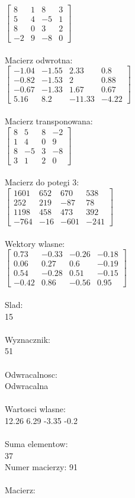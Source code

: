 \documentclass[a4paper,12pt]{article}
\begin{document}
$\begin{bmatrix} 8&1&8&3\\5&4&-5&1\\8&0&3&2\\-2&9&-8&0 \end{bmatrix}$
\\
\\
Macierz odwrotna:\\

$\begin{bmatrix} -1.04&-1.55&2.33&0.8\\-0.82&-1.53&2&0.88\\-0.67&-1.33&1.67&0.67\\5.16&8.2&-11.33&-4.22 \end{bmatrix}$
\\
\\
Macierz transponowana:\\

$\begin{bmatrix} 8&5&8&-2\\1&4&0&9\\8&-5&3&-8\\3&1&2&0 \end{bmatrix}$
\\
\\
Macierz do potegi 3:\\

$\begin{bmatrix} 1601&652&670&538\\252&219&-87&78\\1198&458&473&392\\-764&-16&-601&-241 \end{bmatrix}$
\\
\\
Wektory wlasne:\\

$\begin{bmatrix} 0.73&-0.33&-0.26&-0.18\\0.06&0.27&0.6&-0.19\\0.54&-0.28&0.51&-0.15\\-0.42&0.86&-0.56&0.95 \end{bmatrix}$
\\
\\
Slad:\\
15
\\
\\
Wyznacznik:\\
51
\\
\\
Odwracalnosc:\\
Odwracalna
\\
\\
Wartosci wlasne:\\
12.26 6.29 -3.35 -0.2
\\
\\
Suma elementow:\\
37
\\
\newpage
Numer macierzy:
91
\\
\\
Macierz:\\
\end{document}
